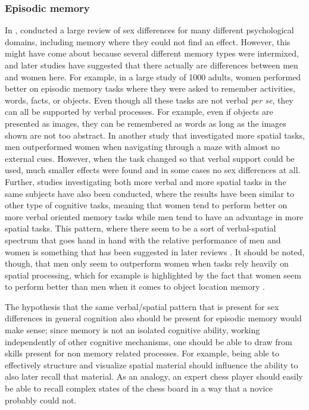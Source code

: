 \subsubsection{Episodic memory}

In \citeyear{Maccoby1975}, \citeauthor{Maccoby1975} conducted a large review of sex differences for many different psychological domains, including memory where they could not find an effect. However, this might have come about because several different memory types were intermixed, and later studies have suggested that there actually are differences between men and women here. For example, in a large study \parencite{ID9011_Herlitz1997} of 1000 adults, women performed better on episodic memory tasks where they were asked to remember activities, words, facts, or objects. Even though all these tasks are not verbal \emph{per se}, they can all be supported by verbal processes. For example, even if objects are presented as images, they can be remembered as words as long as the images shown are not too abstract. In another study \parencite{ID8092_Astur1998} that investigated more spatial tasks, men outperformed women when navigating through a maze with almost no external cues. However, when the task changed so that verbal support could be used, much smaller effects were found and in some cases no sex differences at all. Further, studies investigating both more verbal and more spatial tasks in the same subjects have also been conducted, where the results have been similar to other type of cognitive tasks, meaning that women tend to perform better on more verbal oriented memory tasks while men tend to have an advantage in more spatial tasks\parencite{ID8125_Herlitz1999,ID8024_Lewin2001}. This pattern, where there seem to be a sort of verbal-spatial spectrum that goes hand in hand with the relative performance of men and women is something that has been suggested in later reviews \parencite{Herlitz2008,Andreano2009}. It should be noted, though, that men only seem to outperform women when tasks rely heavily on spatial processing, which for example is highlighted by the fact that women seem to perform better than men when it comes to object location memory \parencite{Voyer2007}.

The hypothesis that the same verbal/spatial pattern that is present for sex differences in general cognition also should be present for episodic memory would make sense; since memory is not an isolated cognitive ability, working independently of other cognitive mechanisms, one should be able to draw from skills present for non memory related processes. For example, being able to effectively structure and visualize spatial material should influence the ability to also later recall that material. As an analogy, an expert chess player should easily be able to recall complex states of the chess board in a way that a novice probably could not.

